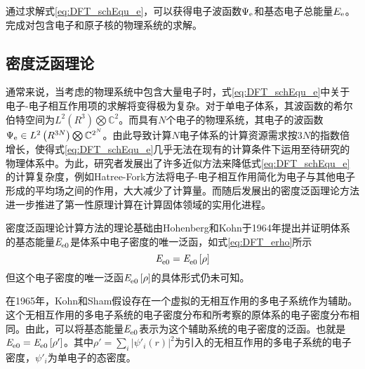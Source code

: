 通过求解式\eqref{eq:DFT_schEqu_e}，可以获得电子波函数$\Psi_{\rm e}$和基态电子总能量$E_{\rm e}$。完成对包含电子和原子核的物理系统的求解。

\subsection{密度泛函理论} 
通常来说，当考虑的物理系统中包含大量电子时，式\eqref{eq:DFT_schEqu_e}中关于电子-电子相互作用项的求解将变得极为复杂。对于单电子体系，其波函数的希尔伯特空间为$L^2\left(R^3\right)\bigotimes \mathbb{C}^2$。而具有$N$个电子的物理系统，其电子的波函数$\Psi_{\rm e}\in L^2\left(R^{3N}\right)\bigotimes \mathbb{C}^{2^N}$。由此导致计算$N$电子体系的计算资源需求按$3N$的指数倍增长，使得式\eqref{eq:DFT_schEqu_e}几乎无法在现有的计算条件下运用至待研究的物理体系中。为此，研究者发展出了许多近似方法来降低式\eqref{eq:DFT_schEqu_e}的计算复杂度，例如Hatree-Fork方法将电子-电子相互作用简化为电子与其他电子形成的平均场之间的作用，大大减少了计算量。而随后发展出的密度泛函理论方法进一步推进了第一性原理计算在计算固体领域的实用化进程。

密度泛函理论计算方法的理论基础由Hohenberg和Kohn于1964年提出并证明\chinesecolon 体系的基态能量$\it E_{\rm e0}^{\rm } \it$是体系中电子密度的唯一泛函，如式\eqref{eq:DFT_erho}所示
\begin{equation}
    \label{eq:DFT_erho}
    \it E_{\rm e0}^{\rm } \it=\it E_{\rm e0}^{\rm } \it\left[\rho\right]
\end{equation}
但这个电子密度的唯一泛函$\it E_{\rm e0}^{\rm } \it\left[\rho\right]$的具体形式仍未可知。

在1965年，Kohn和Sham假设存在一个虚拟的无相互作用的多电子系统作为辅助。这个无相互作用的多电子系统的电子密度分布和所考察的原体系的电子密度分布相同。由此，可以将基态能量$\it E_{\rm e0}^{\rm } \it$表示为这个辅助系统的电子密度的泛函。也就是$\it E_{\rm e0}^{\rm } \it=\it E_{\rm e0}^{\rm } \it\left[\rho'\right]$。其中$\rho'=\sum_i\left\lvert \psi' _i\left(r\right)\right\rvert^2$为引入的无相互作用的多电子系统的电子密度，$\psi'_i$为单电子的态密度。

